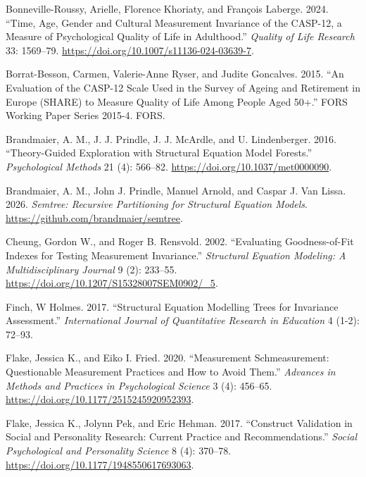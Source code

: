 \documentclass[
  man,
  floatsintext]{apa7}
\newlength{\cslhangindent}
\newenvironment{CSLReferences}[2] %
 {\begin{list}{}{%
  \setlength{\itemindent}{0pt}
  \setlength{\leftmargin}{0pt}
  \setlength{\parsep}{0pt}
  \ifodd #1
   \setlength{\leftmargin}{\cslhangindent}
   \setlength{\itemindent}{-1\cslhangindent}
  \fi
  \setlength{\itemsep}{#2\baselineskip}}}
 {\end{list}}
\begin{document}
\begin{CSLReferences}{1}{0}
Bonneville-Roussy, Arielle, Florence Khoriaty, and François Laberge.
2024. {``{Time, Age, Gender and Cultural Measurement Invariance of the
CASP-12, a Measure of Psychological Quality of Life in Adulthood}.''}
\emph{Quality of Life Research} 33: 1569--79.
\url{https://doi.org/10.1007/s11136-024-03639-7}.

Borrat-Besson, Carmen, Valerie-Anne Ryser, and Judite Goncalves. 2015.
{``{An Evaluation of the CASP-12 Scale Used in the Survey of Ageing and
Retirement in Europe (SHARE) to Measure Quality of Life Among People
Aged 50+}.''} FORS Working Paper Series 2015-4. FORS.

Brandmaier, A. M., J. J. Prindle, J. J. McArdle, and U. Lindenberger.
2016. {``Theory-Guided Exploration with Structural Equation Model
Forests.''} \emph{Psychological Methods} 21 (4): 566--82.
\url{https://doi.org/10.1037/met0000090}.

Brandmaier, A. M., John J. Prindle, Manuel Arnold, and Caspar J. Van
Lissa. 2026. \emph{Semtree: Recursive Partitioning for Structural
Equation Models}. \url{https://github.com/brandmaier/semtree}.

Cheung, Gordon W., and Roger B. Rensvold. 2002. {``Evaluating
Goodness-of-Fit Indexes for Testing Measurement Invariance.''}
\emph{Structural Equation Modeling: A Multidisciplinary Journal} 9 (2):
233--55. \url{https://doi.org/10.1207/S15328007SEM0902/_5}.

Finch, W Holmes. 2017. {``Structural Equation Modelling Trees for
Invariance Assessment.''} \emph{International Journal of Quantitative
Research in Education} 4 (1-2): 72--93.

Flake, Jessica K., and Eiko I. Fried. 2020. {``Measurement
Schmeasurement: Questionable Measurement Practices and How to Avoid
Them.''} \emph{Advances in Methods and Practices in Psychological
Science} 3 (4): 456--65. \url{https://doi.org/10.1177/2515245920952393}.

Flake, Jessica K., Jolynn Pek, and Eric Hehman. 2017. {``Construct
Validation in Social and Personality Research: Current Practice and
Recommendations.''} \emph{Social Psychological and Personality Science}
8 (4): 370--78. \url{https://doi.org/10.1177/1948550617693063}.


\end{CSLReferences}
\end{document}
